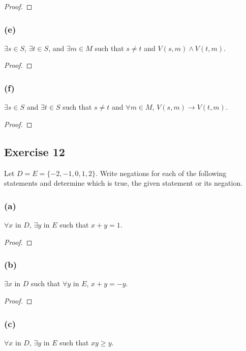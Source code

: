 \documentclass[14pt]{extarticle}
\newcommand{\fa}{\forall}
\newcommand{\te}{\exists}
\begin{document}
\begin{proof}

\end{proof}

\subsubsection{(e)}
$\te s \in S$, $\te t \in S$, and $\te m \in M$ such that $s \neq t$ and $V(s, m) \wedge V(t, m)$.

\begin{proof}

\end{proof}

\subsubsection{(f)}
$\te s \in S$ and $\te t \in S$ such that $s \neq t$ and $\fa m \in M$, $V(s, m) \to V(t, m)$.

\begin{proof}

\end{proof}

\subsection{Exercise 12}
Let $D = E = \{-2, -1, 0, 1, 2\}$. Write negations for each of the following statements and determine which is true, the given statement or its negation.

\subsubsection{(a)}
$\fa x$ in $D$, $\te y$ in $E$ such that $x + y = 1$.

\begin{proof}

\end{proof}

\subsubsection{(b)}
$\te x$ in $D$ such that $\fa y$ in $E$, $x + y = -y$.

\begin{proof}

\end{proof}

\subsubsection{(c)}
$\fa x$ in $D$, $\te y$ in $E$ such that $xy \geq y$.
\end{document}
